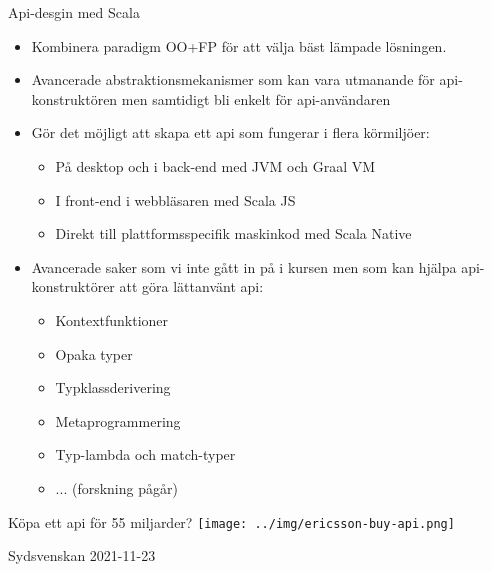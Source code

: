 \begin{Slide}{Api-desgin med Scala}
\begin{itemize}\SlideFontSmall
\item Kombinera paradigm OO+FP för att välja bäst lämpade lösningen.
\item Avancerade abstraktionsmekanismer som kan vara utmanande för api-konstruktören men samtidigt bli enkelt för api-användaren
\item Gör det möjligt att skapa ett api som fungerar i flera körmiljöer:
\begin{itemize}\SlideFontTiny
\item På desktop och i back-end med JVM och Graal VM
\item I front-end i webbläsaren med Scala JS
\item Direkt till plattformsspecifik maskinkod med Scala Native
\end{itemize}
\pause
\item Avancerade saker som vi inte gått in på i kursen men som kan hjälpa api-konstruktörer att göra lättanvänt api:
\begin{itemize}\SlideFontTiny
\item Kontextfunktioner \hfill{}
\item Opaka typer  \hfill{}
\item Typklassderivering \hfill{}
\item Metaprogrammering \hfill{}
\item Typ-lambda och match-typer  \hfill\code{=>>}
\item ...  (forskning pågår)
\end{itemize}
\end{itemize}
\end{Slide}

\ifkompendium\else
\begin{Slide}{Köpa ett api för 55 miljarder?}
\hspace*{-0.7cm}\texttt{[image: ../img/ericsson-buy-api.png]}

{ \vspace{2em} Sydsvenskan 2021-11-23 }
\end{Slide}
\fi




